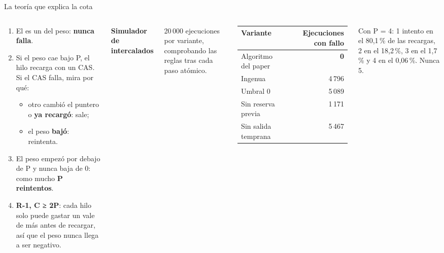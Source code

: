 \begin{frame}{La teoría que explica la cota}
  \begin{columns}[T,onlytextwidth]
    \begin{porque}
      \begin{enumerate}\setlength{\itemsep}{1pt}
        \item El  es un  del peso: \textbf{nunca falla}.
        \item Si el peso cae bajo P, el hilo recarga con un CAS. Si el CAS falla, mira por qué:
        \begin{itemize}
          \item otro cambió el puntero o \textbf{ya recargó}: sale;
          \item el peso \textbf{bajó}: reintenta.
        \end{itemize}
        \item El peso empezó por debajo de P y nunca baja de 0: como mucho \textbf{P reintentos}.
        \item \textbf{R-1, C ≥ 2P}: cada hilo solo puede gastar un vale de más antes de recargar, así que el peso nunca llega a ser negativo.
      \end{enumerate}
    \end{porque}
    \small\textbf{\color{marino}Simulador de intercalados}\par\vspace{1mm}
    \footnotesize 20\,000 ejecuciones por variante, comprobando las reglas tras cada paso atómico.\par\vspace{1mm}
    \begin{tabular}{@{}lr@{}}
      \toprule
      Variante & Ejecuciones con fallo\\
      \midrule
      Algoritmo del paper & \textbf{0}\\
      Ingenua & 4\,796\\
      Umbral 0 & 5\,089\\
      Sin reserva previa & 1\,171\\
      Sin salida temprana & 5\,467\\
      \bottomrule
    \end{tabular}\par\vspace{1mm}
    \scriptsize Con P = 4: 1 intento en el 80,1\,\% de las recargas, 2 en el 18,2\,\%, 3 en el 1,7\,\% y 4 en el 0,06\,\%. Nunca 5.
  \end{columns}
\end{frame}
